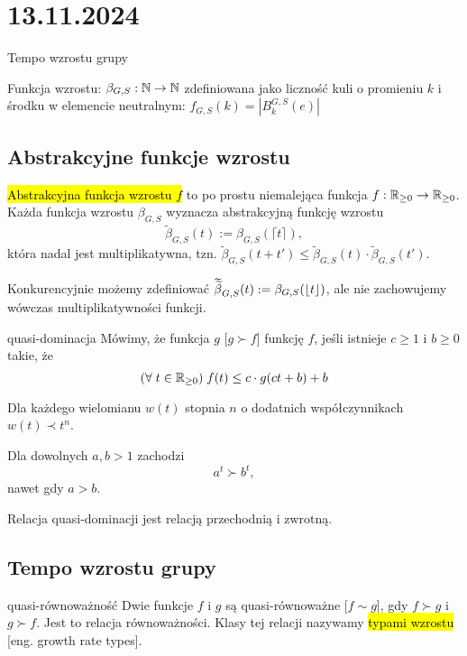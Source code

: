 \section{13.11.2024}{Tempo wzrostu grupy}

Funkcja wzrostu: $\beta_{G, S}:\mathbb{N}\to\mathbb{N}$ zdefiniowana jako liczność kuli o promieniu $k$ i środku w elemencie neutralnym: $f_{G, S}(k)=|B_k^{G,S}(e)|$

\subsection{Abstrakcyjne funkcje wzrostu} %

\hl{Abstrakcyjna funkcja wzrostu $f$} to po prostu niemalejąca funkcja $f:\mathbb{R}_{\geq 0}\to \mathbb{R}_{\geq 0}$. Każda funkcja wzrostu $\beta_{G, S}$ wyznacza abstrakcyjną funkcję wzrostu 
$$\widetilde{\beta}_{G,S}(t):=\beta_{G,S}(\lceil t\rceil),$$
która nadal jest multiplikatywna, tzn. $\widetilde{\beta}_{G,S}(t+t')\leq \widetilde{\beta}_{G,S}(t)\cdot\widetilde{\beta}_{G,S}(t')$.

Konkurencyjnie możemy zdefiniować $\doublewidetilde{\beta}_{G,S}(t):=\beta_{G,S}(\lfloor t\rfloor)$, ale nie zachowujemy wówczas multiplikatywności funkcji.

\begin{definition}{quasi-dominacja}{}
  Mówimy, że funkcja $g$  [$g\succ f$] funkcję $f$, jeśli istnieje $c\geq1$ i $b\geq0$ takie, że
  $$(\forall\;t\in\mathbb{R}_{\geq0})\;f(t)\leq c\cdot g(ct+b)+b$$
\end{definition}

\begin{example}[m]
  \item Dla każdego wielomianu $w(t)$ stopnia $n$ o dodatnich współczynnikach $w(t)\prec t^n$.
  \item Dla dowolnych $a,b>1$ zachodzi 
    $$a^t\succ b^t,$$
    nawet gdy $a>b$.
\end{example}

Relacja quasi-dominacji jest relacją przechodnią i zwrotną.

\subsection{Tempo wzrostu grupy}

\begin{definition}{quasi-równoważność}{}
  Dwie funkcje $f$ i $g$ są quasi-równoważne [$f\sim g$], gdy $f\succ g$ i $g\succ f$. Jest to relacja równoważności. Klasy tej relacji nazywamy \hl{typami wzrostu} [eng. growth rate types].
\end{definition}


